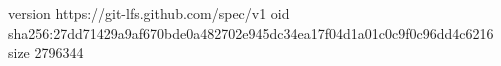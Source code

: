 version https://git-lfs.github.com/spec/v1
oid sha256:27dd71429a9af670bde0a482702e945dc34ea17f04d1a01c0c9f0c96dd4c6216
size 2796344
